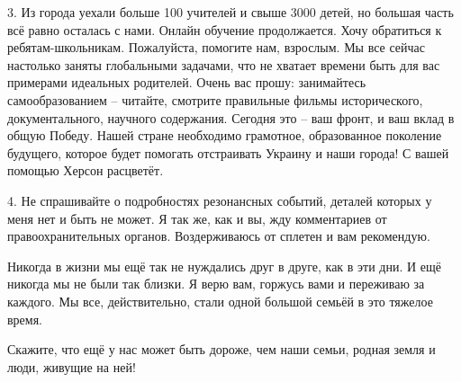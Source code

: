 3. Из города уехали больше 100 учителей и свыше 3000 детей, но большая часть
всё равно осталась с нами. Онлайн обучение продолжается. Хочу обратиться к
ребятам-школьникам. Пожалуйста, помогите нам, взрослым. Мы все сейчас настолько
заняты глобальными задачами, что не хватает времени быть для вас примерами
идеальных родителей. Очень вас прошу: занимайтесь самообразованием – читайте,
смотрите правильные фильмы исторического, документального, научного содержания.
Сегодня это – ваш фронт, и ваш вклад в общую Победу. Нашей стране необходимо
грамотное, образованное поколение будущего, которое будет помогать отстраивать
Украину и наши города! С вашей помощью Херсон расцветёт. 

4. Не спрашивайте о подробностях резонансных событий, деталей которых у меня
нет и быть не может. Я так же, как и вы, жду комментариев от правоохранительных
органов. Воздерживаюсь от сплетен и вам рекомендую.

Никогда в жизни мы ещё так не нуждались друг в друге, как в эти дни. И ещё
никогда мы не были так близки. Я верю вам, горжусь вами и переживаю за каждого.
Мы все, действительно, стали одной большой семьёй в это тяжелое время. 

Скажите, что ещё у нас может быть дороже, чем наши семьи, родная земля и люди,
живущие на ней!
